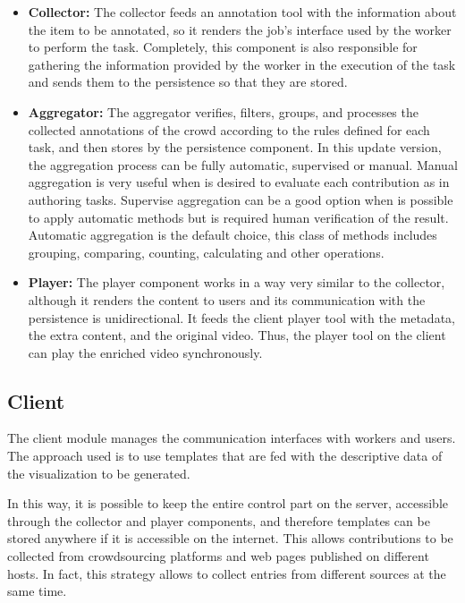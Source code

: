 \begin{itemize}
\item \textbf{Collector: } The collector feeds an annotation tool with the information about the item to be annotated, so it renders the job's interface used by the worker to perform the task. Completely, this component is also responsible for gathering the information provided by the worker in the execution of the task and sends them to the persistence so that they are stored.

\item \textbf{Aggregator: }The aggregator verifies, filters, groups, and processes the collected annotations of the crowd according to the rules defined for each task, and then stores by the persistence component. In this update version, the aggregation process can be fully automatic, supervised or manual. Manual aggregation is very useful when is desired to evaluate each contribution as in authoring tasks. Supervise aggregation can be a good option when is possible to apply automatic methods but is required human verification of the result. Automatic aggregation is the default choice, this class of methods includes grouping, comparing, counting, calculating and other operations.

\item \textbf{Player: } The player component works in a way very similar to the collector, although it renders the content to users and its communication with the persistence is unidirectional. It feeds the client player tool with the metadata, the extra content, and the original video. Thus, the player tool on the client can play the enriched video synchronously.
\end{itemize}


\subsection{Client}
The client module manages the communication interfaces with workers and users. The approach used is to use templates that are fed with the descriptive data of the visualization to be generated.

In this way, it is possible to keep the entire control part on the server, accessible through the collector and player components, and therefore templates can be stored anywhere if it is accessible on the internet. This allows contributions to be collected from crowdsourcing platforms and web pages published on different hosts. In fact, this strategy allows to collect entries from different sources at the same time.

